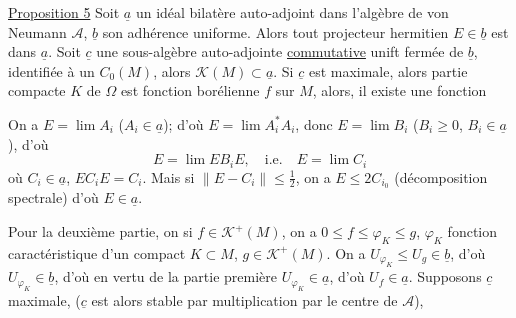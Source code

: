 \uline{Proposition 5} Soit $\underline a$ un idéal bilatère auto-adjoint dans l'algèbre de von Neumann $\mathcal A$, $\underline b$ son adhérence uniforme. Alors tout projecteur hermitien $E\in\underline b$ est dans $\underline a$.  Soit $\underline c$ une sous-algèbre auto-adjointe \uline{commutative} unift fermée de $\underline b$, identifiée à un $C_0(M)$, alors  $\mathcal K(M)\subset\underline a$. Si $\underline c$ est maximale, alors  partie compacte $K$ de $\Omega$ est   fonction borélienne    $f$ sur $M$, alors, il existe une fonction    

On a $E=\lim A_i$ ($A_i\in\underline a$); d'où $E=\lim A_i^*A_i$, donc $E=\lim B_i$ ($B_i\geq0$, $B_i\in\underline a$), d'où
\[
E=\lim EB_iE,\quad\text{i.e.}\quad E=\lim C_i
\]
où $C_i\in\underline a$, $EC_iE=C_i$.  Mais si $\|E-C_i\|\leq\frac12$, on a $E\leq2C_{i_0}$ (décomposition spectrale) d'où $E\in\underline a$.


Pour la deuxième partie, on   si $f\in\mathcal K^+(M)$, on a $0\leq f\leq\varphi_K\leq g$, $\varphi_K$ fonction caractéristique d'un compact $K\subset M$, $g\in\mathcal K^+(M)$. On a $U_{\varphi_K}\leq U_g\in\underline b$, d'où $U_{\varphi_K}\in\underline b$, d'où en vertu de la partie première $U_{\varphi_K}\in\underline a$, d'où $U_f\in\underline a$. Supposons $\underline c$ maximale, ($\underline c$ est alors stable par multiplication par le centre de $\mathcal A$), 
